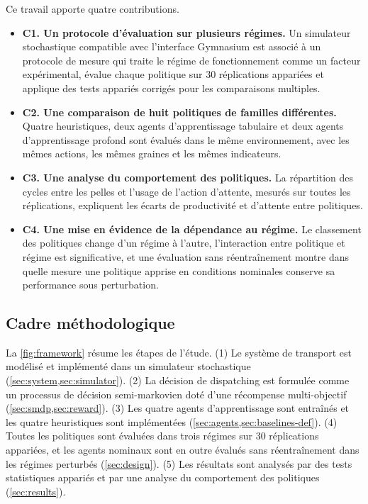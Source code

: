 \documentclass[11pt,a4paper]{article}
\newif\ifrevmarks
\newcommand{\revtag}[1]{\ifrevmarks\textsuperscript{\textcolor{red!70!black}{\scriptsize[#1]}}\fi}
\newenvironment{revbloc}[1]{\par\ifrevmarks\color{revcolor}\noindent\revtag{#1}\ \fi}{\par}
\begin{document}
\begin{revbloc}{M23, M24, M26, M16}
Ce travail apporte quatre contributions.

\begin{itemize}
  \item \textbf{C1. Un protocole d'évaluation sur plusieurs régimes.} Un simulateur stochastique compatible avec l'interface Gymnasium est associé à un protocole de mesure qui traite le régime de fonctionnement comme un facteur expérimental, évalue chaque politique sur 30 réplications appariées et applique des tests appariés corrigés pour les comparaisons multiples.
  \item \textbf{C2. Une comparaison de huit politiques de familles différentes.} Quatre heuristiques, deux agents d'apprentissage tabulaire et deux agents d'apprentissage profond sont évalués dans le même environnement, avec les mêmes actions, les mêmes graines et les mêmes indicateurs.
  \item \textbf{C3. Une analyse du comportement des politiques.} La répartition des cycles entre les pelles et l'usage de l'action d'attente, mesurés sur toutes les réplications, expliquent les écarts de productivité et d'attente entre politiques.
  \item \textbf{C4. Une mise en évidence de la dépendance au régime.} Le classement des politiques change d'un régime à l'autre, l'interaction entre politique et régime est significative, et une évaluation sans réentraînement montre dans quelle mesure une politique apprise en conditions nominales conserve sa performance sous perturbation.
\end{itemize}
\end{revbloc}

\subsection{Cadre méthodologique}

\begin{revbloc}{M24}
La \cref{fig:framework} résume les étapes de l'étude. (1) Le système de transport est modélisé et implémenté dans un simulateur stochastique (\cref{sec:system,sec:simulator}). (2) La décision de dispatching est formulée comme un processus de décision semi-markovien doté d'une récompense multi-objectif (\cref{sec:smdp,sec:reward}). (3) Les quatre agents d'apprentissage sont entraînés et les quatre heuristiques sont implémentées (\cref{sec:agents,sec:baselines-def}). (4) Toutes les politiques sont évaluées dans trois régimes sur 30 réplications appariées, et les agents nominaux sont en outre évalués sans réentraînement dans les régimes perturbés (\cref{sec:design}). (5) Les résultats sont analysés par des tests statistiques appariés et par une analyse du comportement des politiques (\cref{sec:results}).
\end{revbloc}
\end{document}

